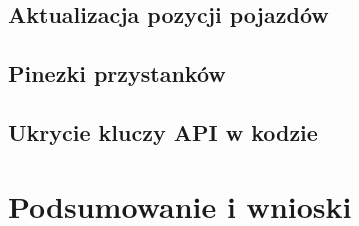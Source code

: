 \documentclass{SGGW-thesis}
\begin{document}
\section{Aktualizacja pozycji pojazdów}
\section{Pinezki przystanków}
\section{Ukrycie kluczy API w kodzie}



\chapter{Podsumowanie i wnioski}


\begin{thebibliography}{9}

\end{thebibliography}

\beforelastpage
\end{document}

